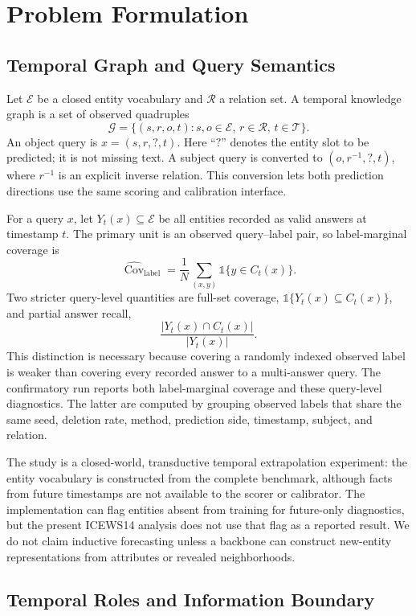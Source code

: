 \documentclass[information,article,submit,oneauthor,pdftex]{Definitions/mdpi}
\newcommand{\cov}{\operatorname{Cov}}
\begin{document}
\section{Problem Formulation}
\label{sec:problem}

\subsection{Temporal Graph and Query Semantics}

Let \(\mathcal{E}\) be a closed entity vocabulary and \(\mathcal{R}\) a relation
set. A temporal knowledge graph is a set of observed quadruples
\[
  \mathcal{G}=\{(s,r,o,t):s,o\in\mathcal{E},\,r\in\mathcal{R},\,t\in\mathcal{T}\}.
\]
An object query is \(x=(s,r,?,t)\). Here ``\(?\)'' denotes the entity slot to
be predicted; it is not missing text. A subject query is converted to
\((o,r^{-1},?,t)\), where \(r^{-1}\) is an explicit inverse relation. This
conversion lets both prediction directions use the same scoring and calibration
interface.

For a query \(x\), let \(Y_t(x)\subseteq\mathcal{E}\) be all entities recorded
as valid answers at timestamp \(t\). The primary unit is an observed
query--label pair, so label-marginal coverage is
\[
  \widehat{\cov}_{\mathrm{label}}
  =\frac{1}{N}\sum_{(x,y)}\mathbb{1}\{y\in C_t(x)\}.
\]
Two stricter query-level quantities are full-set coverage,
\(\mathbb{1}\{Y_t(x)\subseteq C_t(x)\}\), and partial answer recall,
\[
  \frac{|Y_t(x)\cap C_t(x)|}{|Y_t(x)|}.
\]
This distinction is necessary because covering a randomly indexed observed
label is weaker than covering every recorded answer to a multi-answer query.
The confirmatory run reports both label-marginal coverage and these query-level
diagnostics. The latter are computed by grouping observed labels that share the
same seed, deletion rate, method, prediction side, timestamp, subject, and
relation.

The study is a closed-world, transductive temporal extrapolation experiment:
the entity vocabulary is constructed from the complete benchmark, although
facts from future timestamps are not available to the scorer or calibrator.
The implementation can flag entities absent from training for future-only
diagnostics, but the present ICEWS14 analysis does not use that flag as a
reported result. We do not claim inductive forecasting unless a backbone can
construct new-entity representations from attributes or revealed neighborhoods.

\subsection{Temporal Roles and Information Boundary}
\end{document}
